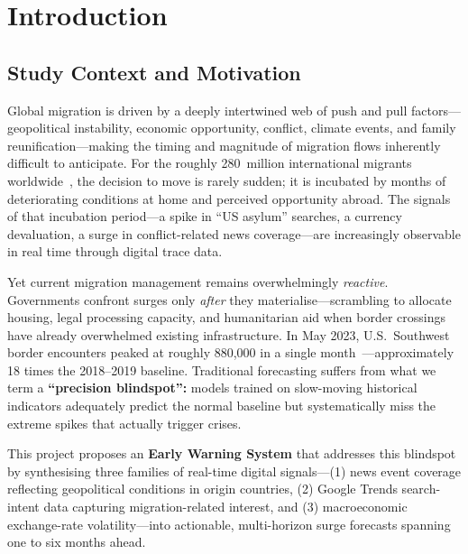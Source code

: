 \documentclass[11pt, a4paper]{article}
\begin{document}
\newpage
\tableofcontents
\newpage


\section{Introduction}

\subsection{Study Context and Motivation}

Global migration is driven by a deeply intertwined web of push and pull
factors---geopolitical instability, economic opportunity, conflict, climate events, and
family reunification---making the timing and magnitude of migration flows inherently
difficult to anticipate.  For the roughly 280~million international migrants
worldwide~\citep{undesa2020}, the decision to move is rarely sudden; it is incubated by
months of deteriorating conditions at home and perceived opportunity abroad.  The
signals of that incubation period---a spike in ``US asylum'' searches, a currency
devaluation, a surge in conflict-related news coverage---are increasingly observable in
real time through digital trace data.

Yet current migration management remains overwhelmingly \textit{reactive}.  Governments
confront surges only \textit{after} they materialise---scrambling to allocate housing,
legal processing capacity, and humanitarian aid when border crossings have already
overwhelmed existing infrastructure.  In May 2023, U.S.\ Southwest border encounters
peaked at roughly 880,000 in a single month~\citep{cbp_encounters}---approximately 18
times the 2018--2019 baseline.  Traditional forecasting suffers from what we term a
\textbf{``precision blindspot'':} models trained on slow-moving historical indicators
adequately predict the normal baseline but systematically miss the extreme spikes that
actually trigger crises.

This project proposes an \textbf{Early Warning System} that addresses this blindspot
by synthesising three families of real-time digital signals---(1) news event coverage
reflecting geopolitical conditions in origin countries, (2) Google Trends search-intent
data capturing migration-related interest, and (3) macroeconomic exchange-rate
volatility---into actionable, multi-horizon surge forecasts spanning one to six months
ahead.
\end{document}
